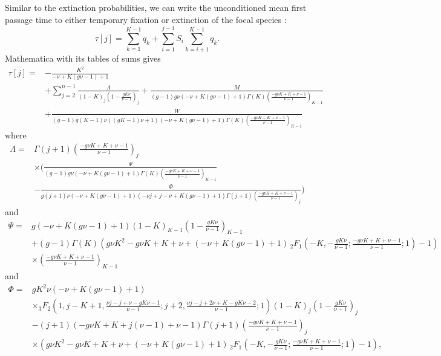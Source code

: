 Similar to the extinction probabilities, we can write the unconditioned mean first passage time to either temporary fixation or extinction of the focal species \cite{Nisbet1982}:
\begin{equation}
\tau[j] = \sum_{k=1}^{K-1}q_k + \sum_{i=1}^{j-1}S_{i}\sum_{k=i+1}^{K-1}q_k. 
\end{equation}
Mathematica with its tables of sums gives
\begin{align*}
\tau[j]=&-\frac{K^2}{-\nu+K (g \nu-1)+1} \\
&+\sum _{j=2}^{n-1} \frac{\Lambda}{(1-K)_j \left(1-\frac{g K \nu}{\nu-1}\right)_j} 
+\frac{M}{(g-1) g \nu (-\nu+K (g \nu-1)+1) \Gamma (K) \left(\frac{-g \nu K+K+\nu-1}{\nu-1}\right)_{K-1}} \\
&+\frac{W}{(g-1) g (K-1) \nu ((g K-1) \nu+1) (-\nu+K (g \nu-1)+1) \Gamma (K) \left(\frac{-g \nu K+K+\nu-1}{\nu-1}\right)_{K-1}}
\end{align*}
where
\begin{align*}
\Lambda = &\Gamma (j+1) \left(\frac{-g \nu K+K+\nu-1}{\nu-1}\right)_j \\
 &\times \Big(\frac{\Psi}{(g-1) g \nu (-\nu+K (g \nu-1)+1) \Gamma (K) \left(\frac{-g \nu K+K+\nu-1}{\nu-1}\right)_{K-1}} \\
 &-\frac{\Phi}{g (j+1) \nu (-\nu+K (g \nu-1)+1) (-\nu j+j-\nu+K (g \nu-1)+1) \Gamma (j+1) \left(\frac{-g \nu K+K+\nu-1}{\nu-1}\right)_j}\Big)
\end{align*}
and
\begin{align*}
\Psi =& g (-\nu+K (g \nu-1)+1) (1-K)_{K-1} \left(1-\frac{g K \nu}{\nu-1}\right)_{K-1} \\
 &+(g-1) \Gamma (K) \left(g \nu K^2-g \nu K+K+\nu+(-\nu+K (g \nu-1)+1) \, _2F_1\left(-K,-\frac{g K \nu}{\nu-1};\frac{-g \nu K+K+\nu-1}{\nu-1};1\right)-1\right) \\
 &\times \left(\frac{-g \nu K+K+\nu-1}{\nu-1}\right)_{K-1}
\end{align*}
and
\begin{align*}
\Phi =& g K^2 \nu (-\nu+K (g \nu-1)+1) \, \\
 &\times {}_3F_2\left(1,j-K+1,\frac{\nu j-j+\nu-g K \nu-1}{\nu-1};j+2,\frac{\nu j-j+2 \nu+K-g K \nu-2}{\nu-1};1\right) (1-K)_j \left(1-\frac{g K \nu}{\nu-1}\right)_j \\
 &-(j+1) (-g \nu K+K+j (\nu-1)+\nu-1) \Gamma (j+1) \left(\frac{-g \nu K+K+\nu-1}{\nu-1}\right)_j \\
 &\times \left(g \nu K^2-g \nu K+K+\nu+(-\nu+K (g \nu-1)+1) \, _2F_1\left(-K,-\frac{g K \nu}{\nu-1};\frac{-g \nu K+K+\nu-1}{\nu-1};1\right)-1\right),
\end{align*}
